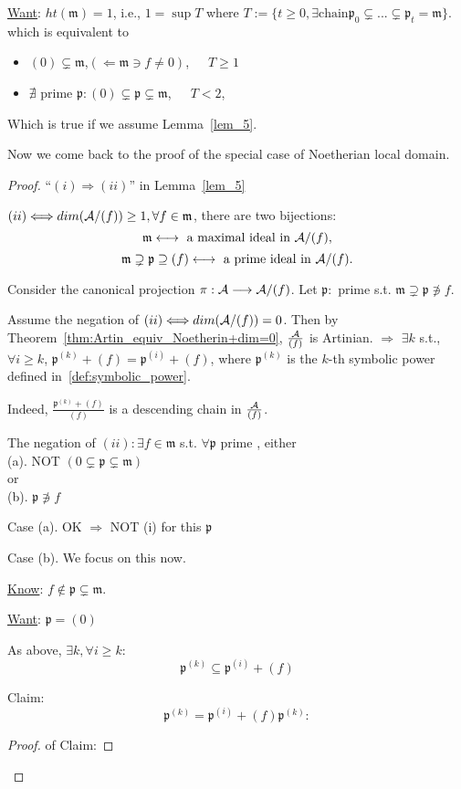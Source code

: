 \documentclass[11pt]{article}
\newcommand{\scm}{{\mathfrak m}}
\newcommand{\scp}{{\mathfrak p}}
\newcommand{\cala}{{\cal A}}
\newcommand{\Lrta}{\Longrightarrow}
\newcommand{\lrta}{\longrightarrow}
\newcommand{\llrta}{\longleftrightarrow}
\newcommand{\Llta}{\Longleftarrow}
\newcommand{\Llrta}{\Longleftrightarrow}
\begin{document}
\underline{Want}: $ht(\scm)=1$, i.e.,
$1=\sup T$ where $T:=\{t\geq 0,\exists \text{chain} \scp_0\subsetneq ...\subsetneq \scp_t=\scm\}$. which is equivalent to 
\begin{itemize}
\item $(0)\subsetneq \scm$,$(\Llta \scm\ni f\neq 0)$,\ \ \  $T\geq 1$
\item $\nexists$ prime $\scp:(0)\subsetneq \scp\subsetneq\scm$,\ \ \ $T< 2$,
\end{itemize}
Which is true if we assume Lemma~\ref{lem_5}.  

Now we come back to the proof of the special case of Noetherian local domain.
\begin{proof}
``$(i)\Lrta(ii)$'' in Lemma~\ref{lem_5}

$(ii)\Llrta dim(\cala/(f))\geq 1, \forall f\in\scm$, there are two bijections: 
$$
\scm\llrta \text{ a maximal ideal in }\cala/(f),
$$
$$
\scm\supsetneq\scp\supseteq(f)\llrta\text{ a prime ideal in }\cala/(f).
$$

Consider the canonical projection $\pi:\cala\lrta \cala/(f)$. Let $\scp:$ prime s.t. $\scm\supsetneq \scp\not \ni f$.

Assume the negation of $(ii)\Llrta dim(\cala/(f))=0$. Then by Theorem~\ref{thm:Artin_equiv_Noetherin+dim=0},
$\frac{\cala}{(f)}$ is  Artinian.  $\Lrta$ $\exists k$ s.t., $\forall i\geq k$, $\scp^{(k)}+(f)=\scp^{(i)}+(f)$, where $\scp^{(k)}$ is the $k$-th symbolic power defined in~\ref{def:symbolic_power}.

Indeed, $\frac{\scp^{(k)}+(f)}{(f)}$ is a descending chain in $\frac{\cala}{(f)}$.

The negation of $(ii):\exists f\in \scm$ s.t. $\forall \scp$ prime , either\\
(a). NOT $(0\subsetneq \scp\subsetneq\scm)$\\
or\\
(b). $\scp\not\ni f$

Case (a). OK $\Lrta $ NOT (i) for this $\scp$

Case (b). We focus on this now.

\underline{Know}: $f\notin \scp\subsetneq \scm$.

\underline{Want}: $\scp=(0)$

As above, $\exists k,\forall i\geq k$: 
\begin{equation}\tag{*}
\scp^{(k)}\subseteq\scp^{(i)}+(f)
\end{equation}

Claim:
\begin{equation}\tag{**}
\scp^{(k)}=\scp^{(i)}+(f)\scp^{(k)}:
\end{equation}
\begin{proof} of Claim:


\end{proof}
\end{proof}
\end{document}
